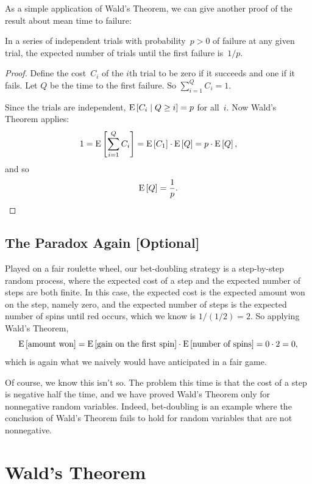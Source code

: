 \documentclass[11pt,twoside]{article}
\begin{document}
As a simple application of Wald's Theorem, we can give another proof of
the result about mean time to failure:
\begin{corollary}\label{meantime}
In a series of independent trials with probability~$p>0$ of failure at any
given trial, the expected number of trials until the first failure
is~$1/p$.
\end{corollary}

\begin{proof}
Define the cost~$C_i$ of the $i$th trial to be zero if it succeeds and
one if it fails.  Let $Q$ be the time to the first failure.  So
$\sum_{i = 1}^Q C_i = 1$.

Since the trials are independent, $\mathop{\textup{E}}\nolimits\left[C_i\mid Q \geq i\right] = p$ for
all~$i$.  Now Wald's Theorem applies:
\[
    1 = \mathop{\textup{E}}\nolimits\left[\sum_{i = 1}^Q C_i\right]
      = \mathop{\textup{E}}\nolimits\left[C_1\right] \cdot \mathop{\textup{E}}\nolimits\left[Q\right]
      = p \cdot \mathop{\textup{E}}\nolimits\left[Q\right],
\]
and so
\[
    \mathop{\textup{E}}\nolimits\left[Q\right] = \frac{1}{p}.
\]
\end{proof}

\subsection{The Paradox Again [Optional]}

\begin{optional}

Played on a fair roulette wheel, our bet-doubling strategy is a
step-by-step random process, where the expected cost of a step and the
expected number of steps are both finite.  In this case, the expected cost
is the expected amount won on the step, namely zero, and the expected
number of steps is the expected number of spins until red occurs, which we
know is $1/(1/2) = 2$.  So applying Wald's Theorem,
\[
\mathop{\textup{E}}\nolimits\left[\mbox{amount won}\right]  =  \mathop{\textup{E}}\nolimits\left[\mbox{gain on the first
spin}\right]\cdot \mathop{\textup{E}}\nolimits\left[\mbox{number of spins}\right] =  0 \cdot 2 = 0,
\]
which is again what we naively would have anticipated in a fair game.

Of course, we know this isn't so.  The problem this time is that the cost
of a step is negative half the time, and we have proved Wald's Theorem
only for nonnegative random variables.  Indeed, bet-doubling is an example
where the conclusion of Wald's Theorem fails to hold for random variables
that are not nonnegative.

\end{optional}

\iffalse

\section{Wald's Theorem}
\end{document}
